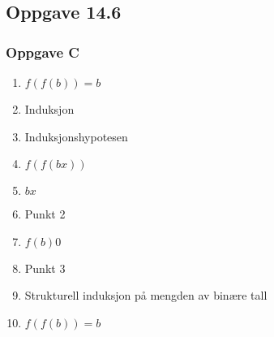 \documentclass[norsk, 12p]{article}
\begin{document}
\pagebreak

\subsection{Oppgave 14.6}
\subsubsection{Oppgave C}
\begin{enumerate}
\item $f(f(b)) = b$
\item Induksjon
\item Induksjonshypotesen
\item $f(f(bx))$
\item $bx$
\item Punkt 2
\item $f(b)0$
\item Punkt 3
\item Strukturell induksjon på mengden av binære tall
\item $f(f(b)) = b$
\end{enumerate}
\end{document}
